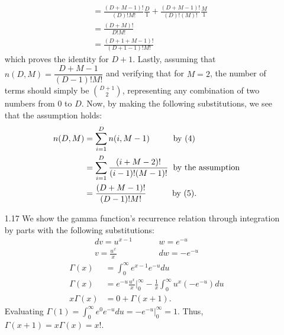 \documentclass[]{article}
\begin{document}
\begin{enumerate}
\begin{align*}
 	&= \frac{(D+M-1)!}{(D)!M!}\frac{D}{1} + \frac{(D+M-1)!}{(D)!(M)!}\frac{M}{1} \\
 	&= \frac{(D+M)!}{D!M!} \\
 	&= \frac{(D+1+M-1)!}{(D+1-1)!M!}
 	\end{align*}
 	which proves the identity for $D+1$. Lastly, assuming that $n(D,M)=\dfrac{D+M-1}{(D-1)!M!}$ and verifying that for $M=2$, the number of terms should simply be $\binom{D+1}{2}$, representing any combination of two numbers from 0 to $D$. Now, by making the following substitutions, we see that the assumption holds:
 	\begin{align*}
 	n(D,M)&=\sum_{i=1}^{D} n(i, M-1) \hspace{1cm} \text{by (4)} \\
 	&=\sum_{i=1}^{D}\frac{(i + M - 2)!}{(i-1)!(M-1)!} \hspace{.2cm} \text{by the assumption} \\
 	&=\frac{(D + M - 1)!}{(D-1)!M!} \hspace{1.1cm} \text{by (5)}.
 	\end{align*}
 	
 	\item[1.17] We show the gamma function's recurrence relation through integration by parts with the following substitutions:
 	\begin{align*}
 	dv = u^{x - 1} &\hspace{1cm} w = e^{-u} \\
 	v = \frac{u^x}{x} & \hspace{1cm} dw = -e^{-u}
 	\end{align*}
 	\begin{align*}
 	\Gamma(x) &= \int_{0}^{\infty} e^{x - 1}e^{-u}du \\
 	\Gamma(x) &= e^{-u}\frac{u^x}{x} \Big|^\infty_0 - \frac{1}{x} \int_{0}^{\infty} u^x (-e^{-u})du \\
 	x\Gamma(x) &= 0 + \Gamma(x+1).
 	\end{align*}
 	Evaluating $\Gamma(1) = \int_{0}^{\infty} e^{0}e^{-u}du=-e^{-u}\Big|^\infty_0=1.$ Thus, $\Gamma(x+1) = x\Gamma(x) = x!$.
 	

\end{enumerate}
\end{document}
